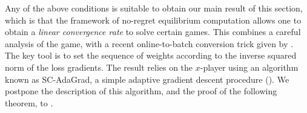 \documentclass[final,12pt]{colt2018} %
\def\reals{\mathbb{R}}
\def\reals{\mathbb{R}}
\newcommand{\yx}[1]{y_{#1}}
\newcommand{\XX}{\mathcal{X}}
\newcommand{\YY}{\mathcal{Y}}
\begin{document}
Any of the above conditions is suitable to obtain our main result of this section, which is that the framework of no-regret equilibrium computation allows one to obtain a \emph{linear convergence rate} to solve certain games. This combines a careful analysis of the game, with a recent online-to-batch conversion trick given by \citet{L17}. The key tool is to set the sequence of weights according to the inverse squared norm of the loss gradients. The result relies on the $x$-player using an algorithm known as SC-AdaGrad, a simple adaptive gradient descent procedure (). We postpone the description of this algorithm, and the proof of the following theorem, to .






\end{document}

